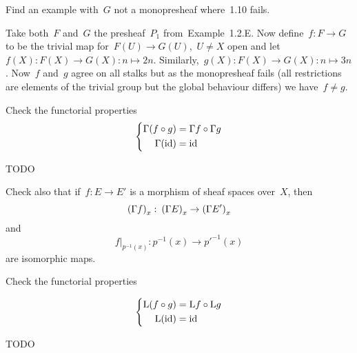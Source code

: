 \documentclass[a4paper,11pt,oneside,openany,article]{memoir}
\begin{document}
\begin{exercise}[1.12]
  Find an example with~$G$ not a monopresheaf where~1.10 fails.

  \begin{solution}
    Take both~$F$ and~$G$ the presheaf~$P_1$ from~Example~1.2.E. Now define~$f\colon F\to G$ to be the trivial map for~$F(U)\to G(U)$,~$U\neq X$ open and let~$f(X)\colon F(X)\to G(X):n\mapsto 2n$. Similarly,~$g(X)\colon F(X)\to G(X):n\mapsto 3n$. Now~$f$ and~$g$ agree on all stalks but as the monopresheaf fails (all restrictions are elements of the trivial group but the global behaviour differs) we have~$f\neq g$.
  \end{solution}
\end{exercise}

\begin{exercise}[3.7]
  Check the functorial properties
  \begin{equation}
    \left\{
      \begin{aligned}
        \mathrm{\Gamma}(f\circ g)&=\mathrm{\Gamma} f\circ\mathrm{\Gamma} g \\
        \mathrm{\Gamma}(\operatorname{id})&=\operatorname{id}
      \end{aligned}
    \right.
  \end{equation}

  \begin{solution}
    TODO
  \end{solution}

  Check also that if~$f\colon E\to E'$ is a morphism of sheaf spaces over~$X$, then
  \begin{equation}
    \left( \mathrm{\Gamma} f \right)_x\colon\left( \mathrm{\Gamma} E \right)_x\to\left( \mathrm{\Gamma} E' \right)_x
  \end{equation}
  and
  \begin{equation}
    f|_{p^{-1}(x)}\colon p^{-1}(x)\to p'^{-1}(x)
  \end{equation}
  are isomorphic maps.
\end{exercise}

\begin{exercise}[3.9]
  Check the functorial properties

  \begin{equation}
    \left\{
      \begin{aligned}
        \mathrm{L}(f\circ g)&=\mathrm{L} f\circ\mathrm{L} g \\
        \mathrm{L}(\operatorname{id})&=\operatorname{id}
      \end{aligned}
    \right.
  \end{equation}

  \begin{solution}
    TODO
  \end{solution}
\end{exercise}
\end{document}
